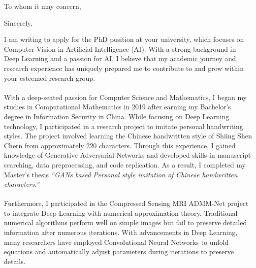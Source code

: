 \documentclass[11pt,a4paper, final]{moderncv}
\begin{document}
\date{\today}
\opening{To whom it may concern,} %
\closing{Sincerely,}
\makelettertitle
I am writing to apply for the PhD position at your university,
which focuses on Computer Vision in Artificial Intelligence (AI). 
With a strong background in Deep Learning and a passion for AI, 
I believe that my academic journey and research experience 
has uniquely prepared me to contribute to and grow within your esteemed research group.
\ \\
\ \\
With a deep-seated passion for Computer Science and Mathematics, 
I began my studies in Computational Mathematics in 2019 after earning my Bachelor's degree in Information Security in China.
While focusing on Deep Learning technology, I participated in a research project to imitate personal handwriting styles.
The project involved learning the Chinese handwritten style of Shiing Shen Chern from approximately 220 characters.
Through this experience, I gained knowledge of Generative Adversarial Networks 
and developed skills in manuscript searching, data preprocessing, and code replication.
As a result, I completed my Master's thesis \emph{“GANs based Personal style imitation of Chinese handwritten characters.”}
\ \\
\ \\
Furthermore, I participated in the Compressed Sensing MRI ADMM-Net project 
to integrate Deep Learning with numerical approximation theory. 
Traditional numerical algorithms perform well on simple images 
but fail to preserve detailed information after numerous iterations.
With advancements in Deep Learning, 
many researchers have employed Convolutional Neural Networks to unfold equations 
and automatically adjust parameters during iterations to preserve details. 
\end{document}
